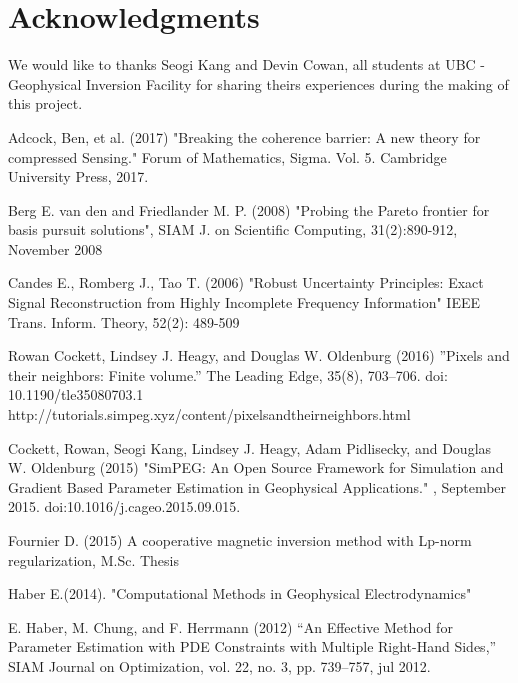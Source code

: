 \documentclass[twoside]{article}
\begin{document}
\section{Acknowledgments}
We would like to thanks Seogi Kang and Devin Cowan, all students at UBC - Geophysical Inversion Facility for sharing theirs experiences during the making of this project.
\newpage

\begin{thebibliography}{99}

Adcock, Ben, et al. (2017)
\newblock "Breaking the coherence barrier: A new theory for compressed Sensing." Forum of Mathematics, Sigma. Vol. 5. Cambridge University Press, 2017.

Berg E. van den  and Friedlander M. P. (2008)
\newblock "Probing the Pareto frontier for basis pursuit solutions", SIAM J. on Scientific Computing, 31(2):890-912, November 2008

Candes E., Romberg J., Tao T. (2006)
\newblock "Robust Uncertainty Principles: Exact Signal Reconstruction from Highly Incomplete Frequency Information"
\newblock IEEE Trans. Inform. Theory, 52(2): 489-509

Rowan Cockett, Lindsey J. Heagy, and Douglas W. Oldenburg (2016)
\newblock ”Pixels and their neighbors: Finite volume.” The Leading Edge, 35(8), 703–706. doi: 10.1190/tle35080703.1
\newblock http://tutorials.simpeg.xyz/content/pixelsandtheirneighbors.html

Cockett, Rowan, Seogi Kang, Lindsey J. Heagy, Adam Pidlisecky, and Douglas W. Oldenburg (2015)
\newblock "SimPEG: An Open Source Framework for Simulation and Gradient Based Parameter Estimation in Geophysical Applications." 
, September 2015. doi:10.1016/j.cageo.2015.09.015.

Fournier D. (2015)
\newblock A cooperative magnetic inversion method with Lp-norm regularization, M.Sc. Thesis

Haber E.(2014).
\newblock "Computational Methods in Geophysical Electrodynamics"

E. Haber, M. Chung, and F. Herrmann (2012)
\newblock  “An Effective Method for Parameter Estimation with PDE Constraints with Multiple Right-Hand Sides,” SIAM Journal on Optimization, vol. 22, no. 3, pp. 739–757, jul 2012.


\end{thebibliography}
\end{document}
